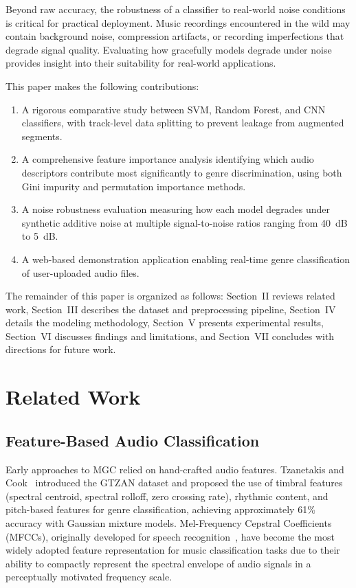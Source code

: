 \documentclass[10pt,journal]{IEEEtran}
\begin{document}
Beyond raw accuracy, the robustness of a classifier to real-world noise conditions is critical for practical deployment. Music recordings encountered in the wild may contain background noise, compression artifacts, or recording imperfections that degrade signal quality. Evaluating how gracefully models degrade under noise provides insight into their suitability for real-world applications.

This paper makes the following contributions:
\begin{enumerate}
    \item A rigorous comparative study between SVM, Random Forest, and CNN classifiers, with track-level data splitting to prevent leakage from augmented segments.
    \item A comprehensive feature importance analysis identifying which audio descriptors contribute most significantly to genre discrimination, using both Gini impurity and permutation importance methods.
    \item A noise robustness evaluation measuring how each model degrades under synthetic additive noise at multiple signal-to-noise ratios ranging from 40~dB to 5~dB.
    \item A web-based demonstration application enabling real-time genre classification of user-uploaded audio files.
\end{enumerate}

The remainder of this paper is organized as follows: Section~II reviews related work, Section~III describes the dataset and preprocessing pipeline, Section~IV details the modeling methodology, Section~V presents experimental results, Section~VI discusses findings and limitations, and Section~VII concludes with directions for future work.

\section{Related Work}

\subsection{Feature-Based Audio Classification}

Early approaches to MGC relied on hand-crafted audio features. Tzanetakis and Cook~\cite{tzanetakis2002musical} introduced the GTZAN dataset and proposed the use of timbral features (spectral centroid, spectral rolloff, zero crossing rate), rhythmic content, and pitch-based features for genre classification, achieving approximately 61\% accuracy with Gaussian mixture models. Mel-Frequency Cepstral Coefficients (MFCCs), originally developed for speech recognition~\cite{davis1980comparison, logan2000mel}, have become the most widely adopted feature representation for music classification tasks due to their ability to compactly represent the spectral envelope of audio signals in a perceptually motivated frequency scale.
\end{document}
